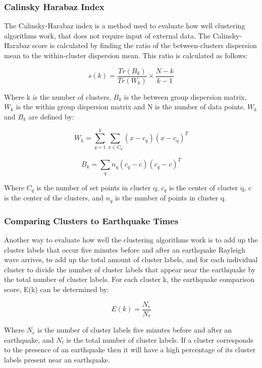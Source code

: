 \documentclass[colorlinks=true,pdfstartview=FitV,linkcolor=blue,
            citecolor=red,urlcolor=magenta]{ligodoc}
\begin{document}
\subsubsection{Calinsky Harabaz Index}

\indent

\par The Calinsky-Harabaz index is a method used to evaluate how well clustering algorithms work, that does not require input of external data. The Calinsky-Harabaz score is calculated by finding the ratio of the between-clusters dispersion mean to the within-cluster dispersion mean. This ratio is calculated as follows:

\[s(k) = \frac{Tr(B_k)}{Tr(W_k)}\times\frac{N-k}{k-1}\]

\par Where k is the number of clusters, \(B_k\) is the between group dispersion matrix, \(W_k\) is the within group dispersion matrix and N is the number of data points. \(W_k\) and  \(B_k\) are defined by:

\[W_k = \sum_{q=1}^{k} \sum_{x \in C_q} (x-c_q)(x-c_q)^T\]

\[B_k = \sum_{q} n_q (c_q-c)(c_q-c)^T\]

\par Where \(C_q\) is the number of set points in cluster q, \(c_q\) is the center of cluster q, c is the center of the clusters, and \(n_q\) is the number of points in cluster q. \cite{Citation2} 

\subsubsection{Comparing Clusters to Earthquake Times}

\indent 

\par Another way to evaluate how well the clustering algorithms work is to add up the cluster labels that occur five  minutes before and after an earthquake Rayleigh wave arrives, to add up the total amount of cluster labels, and for each individual cluster to divide the number of cluster labels that appear near the earthquake by the total number of cluster labels. For each cluster k, the earthquake comparison score, E(k) can be determined by:

\[E(k) = \frac{N_e}{N_t}\]

Where \(N_e\) is the number of cluster labels five minutes before and after an earthquake, and \(N_t\) is the total number of cluster labels. If a cluster corresponds to the presence of an earthquake then it will have a high percentage of its cluster labels present near an earthquake.  
\end{document}

